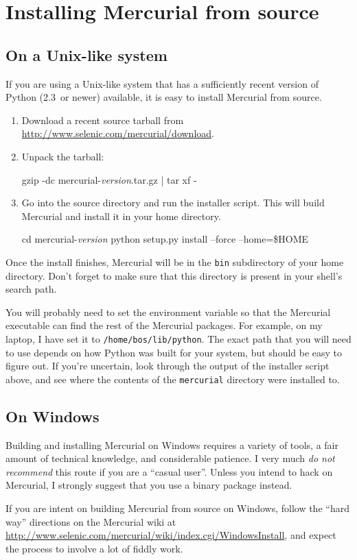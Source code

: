 \chapter{Installing Mercurial from source}
\label{chap:srcinstall}

\section{On a Unix-like system}
\label{sec:srcinstall:unixlike}

If you are using a Unix-like system that has a sufficiently recent
version of Python (2.3~or newer) available, it is easy to install
Mercurial from source.
\begin{enumerate}
\item Download a recent source tarball from
  \url{http://www.selenic.com/mercurial/download}.
\item Unpack the tarball:
  \begin{codesample4}
    gzip -dc mercurial-\emph{version}.tar.gz | tar xf -
  \end{codesample4}
\item Go into the source directory and run the installer script.  This
  will build Mercurial and install it in your home directory.
  \begin{codesample4}
    cd mercurial-\emph{version}
    python setup.py install --force --home=\$HOME
  \end{codesample4}
\end{enumerate}
Once the install finishes, Mercurial will be in the \texttt{bin}
subdirectory of your home directory.  Don't forget to make sure that
this directory is present in your shell's search path.

You will probably need to set the  environment
variable so that the Mercurial executable can find the rest of the
Mercurial packages.  For example, on my laptop, I have set it to
\texttt{/home/bos/lib/python}.  The exact path that you will need to
use depends on how Python was built for your system, but should be
easy to figure out.  If you're uncertain, look through the output of
the installer script above, and see where the contents of the
\texttt{mercurial} directory were installed to.

\section{On Windows}

Building and installing Mercurial on Windows requires a variety of
tools, a fair amount of technical knowledge, and considerable
patience.  I very much \emph{do not recommend} this route if you are a
``casual user''.  Unless you intend to hack on Mercurial, I strongly
suggest that you use a binary package instead.

If you are intent on building Mercurial from source on Windows, follow
the ``hard way'' directions on the Mercurial wiki at
\url{http://www.selenic.com/mercurial/wiki/index.cgi/WindowsInstall},
and expect the process to involve a lot of fiddly work.

